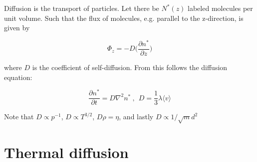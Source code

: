 \documentclass[a4paper]{article}
\begin{document}
Diffusion is the transport of particles. Let there be $N^*(z)$ labeled molecules per unit volume. Such that the flux of molecules, e.g. parallel to the z-direction, is given by

\begin{equation}
	\Phi_z=-D\bigg(\frac{\partial n^*}{\partial z}\bigg)
\end{equation}

where $D$ is the coefficient of self-diffusion. From this follows the diffusion equation:

\begin{equation}
	\frac{\partial n^*}{\partial t}=D\nabla^2n^*\ ,\ \ D=\frac{1}{3}\lambda\langle v\rangle 
\end{equation}

Note that $D\propto p^{-1}$, $D\propto T^{3/2}$, $D\rho=\eta$, and lastly $D\propto 1/\sqrt{m}d^2$

\section{Thermal diffusion}
\end{document}
